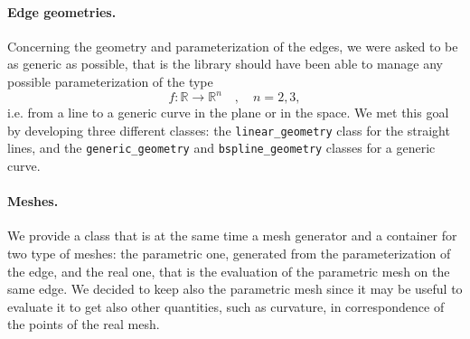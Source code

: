 \documentclass[11pt]{article} %
\newcommand{\classname}[1]{\texttt{#1}}
\begin{document}
		\paragraph{Edge geometries.} Concerning the geometry and parameterization of the edges, we were asked to be as generic as possible, that is the library should have been able to manage any possible parameterization of the type
		\begin{equation*}
			f:\mathbb{R}\rightarrow\mathbb{R}^{n} \quad, \quad n=2,3 ,
		\end{equation*}
		i.e. from a line to a generic curve in the plane or in the space. We met this goal by developing three different classes: the \classname{linear\_geometry} class for the straight lines, and the \classname{generic\_geometry} and \classname{bspline\_geometry} classes for a generic curve.
		\paragraph{Meshes.} We provide a class that is at the same time a mesh generator and a container for two type of meshes: the parametric one, generated from the parameterization of the edge, and the real one, that is the evaluation of the parametric mesh on the same edge. We decided to keep also the parametric mesh since it may be useful to evaluate it to get also other quantities, such as curvature, in correspondence of the points of the real mesh.
		
\end{document}
